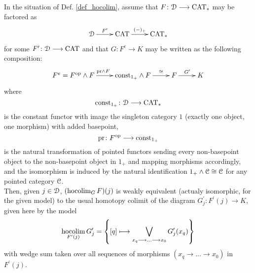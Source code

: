     \begin{lem}\label{lem_hocolim_name_justification}
      In the situation of Def. \ref{def_hocolim}, assume that $F \colon \mathcal{D} \longrightarrow
      \mathrm{CAT}_*$ may be factored as
      \begin{displaymath}
        \xymatrix{
          \cD \ar[r]^-{F^\prime} &
          \CAT \ar[r]^-{(-)_+} &
          \CAT_*
        }
      \end{displaymath}
      for some $F^\prime \colon \mathcal{D} \longrightarrow \mathrm{CAT}$ and that $G \colon F^e \to K$ may
      be written as the following composition:
      \begin{displaymath}
        \xymatrix{
          F^e = F^{\op} \wedge F \ar[r]^{\mathrm{pr} \wedge F} &
          \mathrm{const}_{1_+} \wedge F \ar[r]^-{\cong} &
          F \ar[r]^{G^\prime} &
          K
        }
      \end{displaymath}
      where 
      \begin{displaymath}
        \mathrm{const}_{1_+} \colon \mathcal{D} \longrightarrow \mathrm{CAT}_*
      \end{displaymath}
      is the constant functor with image the singleton category $1$ (exactly one
      object, one morphism) with added basepoint, 
      \begin{displaymath}
        \mathrm{pr} \colon F^{\mathrm{op}} \longrightarrow \mathrm{const}_{1_+}
      \end{displaymath}
      is the natural transformation of pointed functors sending every
      non-basepoint object to the non-basepoint object in $1_+$ and mapping
      morphisms accordingly, and the isomorphism is induced by the natural
      identification $1_+ \wedge \mathcal{C} \cong \mathcal{C}$ for any pointed category
      $\mathcal{C}$.\\
      Then, given $j \in \mathcal{D}$, $(\operatorname*{hocolim}_G F)(j)$ is weakly equivalent (actualy
      isomorphic, for the given model) to the usual homotopy colimit of the
      diagram $G^\prime_j \colon F^\prime(j) \to K$, given here by the model
      \begin{displaymath}
        \operatorname*{hocolim}_{F^\prime(j)} G_j^\prime = \left\{ 
          [q] \longmapsto \bigvee_{x_q \longrightarrow \ldots \longrightarrow x_0} G_j^\prime(x_q)
        \right\}
      \end{displaymath}
      with wedge sum taken over all sequences of morphisms $(x_q \to \ldots \to
      x_0)$ in $F^\prime(j)$.
    \end{lem}
